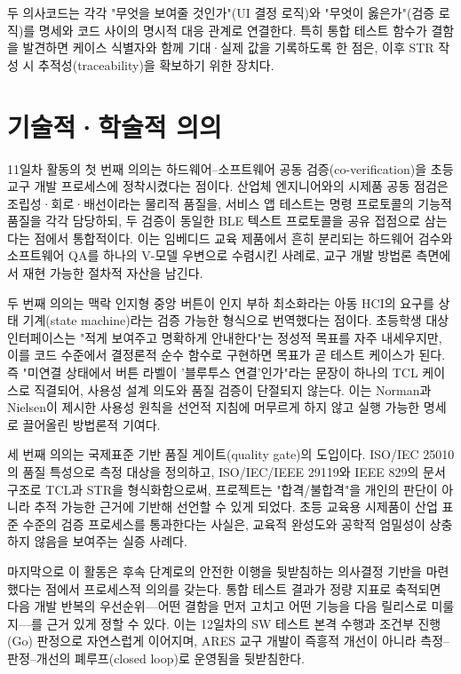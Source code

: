두 의사코드는 각각 "무엇을 보여줄 것인가"(UI 결정 로직)와 "무엇이 옳은가"(검증 로직)를 명세와 코드 사이의 명시적 대응 관계로 연결한다. 특히 통합 테스트 함수가 결함을 발견하면 케이스 식별자와 함께 기대·실제 값을 기록하도록 한 점은, 이후 STR 작성 시 추적성(traceability)을 확보하기 위한 장치다.

\section{기술적·학술적 의의}

11일차 활동의 첫 번째 의의는 하드웨어–소프트웨어 공동 검증(co-verification)을 초등 교구 개발 프로세스에 정착시켰다는 점이다. 산업체 엔지니어와의 시제품 공동 점검은 조립성·회로·배선이라는 물리적 품질을, 서비스 앱 테스트는 명령 프로토콜의 기능적 품질을 각각 담당하되, 두 검증이 동일한 BLE 텍스트 프로토콜을 공유 접점으로 삼는다는 점에서 통합적이다. 이는 임베디드 교육 제품에서 흔히 분리되는 하드웨어 검수와 소프트웨어 QA를 하나의 V-모델 우변으로 수렴시킨 사례로, 교구 개발 방법론 측면에서 재현 가능한 절차적 자산을 남긴다.

두 번째 의의는 맥락 인지형 중앙 버튼이 인지 부하 최소화라는 아동 HCI의 요구를 상태 기계(state machine)라는 검증 가능한 형식으로 번역했다는 점이다. 초등학생 대상 인터페이스는 "적게 보여주고 명확하게 안내한다"는 정성적 목표를 자주 내세우지만, 이를 코드 수준에서 결정론적 순수 함수로 구현하면 목표가 곧 테스트 케이스가 된다. 즉 "미연결 상태에서 버튼 라벨이 '블루투스 연결'인가"라는 문장이 하나의 TCL 케이스로 직결되어, 사용성 설계 의도와 품질 검증이 단절되지 않는다. 이는 Norman과 Nielsen이 제시한 사용성 원칙\cite{norman2013design,nielsen1994heuristics}을 선언적 지침에 머무르게 하지 않고 실행 가능한 명세로 끌어올린 방법론적 기여다.

세 번째 의의는 국제표준 기반 품질 게이트(quality gate)의 도입이다. ISO/IEC 25010의 품질 특성으로 측정 대상을 정의하고\cite{iso25010}, ISO/IEC/IEEE 29119와 IEEE 829의 문서 구조로 TCL과 STR을 형식화함으로써\cite{iso29119,ieee829}, 프로젝트는 "합격/불합격"을 개인의 판단이 아니라 추적 가능한 근거에 기반해 선언할 수 있게 되었다. 초등 교육용 시제품이 산업 표준 수준의 검증 프로세스를 통과한다는 사실은, 교육적 완성도와 공학적 엄밀성이 상충하지 않음을 보여주는 실증 사례다.

마지막으로 이 활동은 후속 단계로의 안전한 이행을 뒷받침하는 의사결정 기반을 마련했다는 점에서 프로세스적 의의를 갖는다. 통합 테스트 결과가 정량 지표로 축적되면 다음 개발 반복의 우선순위—어떤 결함을 먼저 고치고 어떤 기능을 다음 릴리스로 미룰지—를 근거 있게 정할 수 있다. 이는 12일차의 SW 테스트 본격 수행과 조건부 진행(Go) 판정으로 자연스럽게 이어지며, ARES 교구 개발이 즉흥적 개선이 아니라 측정–판정–개선의 폐루프(closed loop)로 운영됨을 뒷받침한다.

